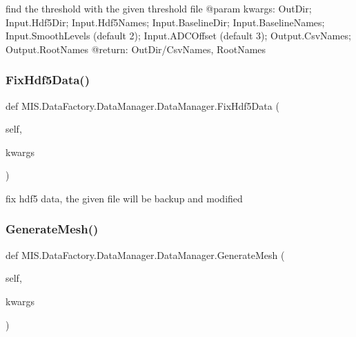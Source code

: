 \begin{DoxyVerb}find the threshold with the given threshold file
@param kwargs: OutDir; Input.Hdf5Dir; Input.Hdf5Names; Input.BaselineDir; Input.BaselineNames;
    Input.SmoothLevels (default 2); Input.ADCOffset (default 3); Output.CsvNames; Output.RootNames
@return: OutDir/CsvNames, RootNames
\end{DoxyVerb}
 \mbox{\label{classMIS_1_1DataFactory_1_1DataManager_1_1DataManager_a527698e508175494049d1170eb263fea}} 
\subsubsection{\texorpdfstring{Fix\+Hdf5\+Data()}{FixHdf5Data()}}
{\footnotesize\ttfamily def M\+I\+S.\+Data\+Factory.\+Data\+Manager.\+Data\+Manager.\+Fix\+Hdf5\+Data (\begin{DoxyParamCaption}\item[{}]{self,  }\item[{}]{kwargs }\end{DoxyParamCaption})}

\begin{DoxyVerb}fix hdf5 data, the given file will be backup and modified\end{DoxyVerb}
 \mbox{\label{classMIS_1_1DataFactory_1_1DataManager_1_1DataManager_a94176bcc4c3de7974b29e1e1a2396de8}} 
\subsubsection{\texorpdfstring{Generate\+Mesh()}{GenerateMesh()}}
{\footnotesize\ttfamily def M\+I\+S.\+Data\+Factory.\+Data\+Manager.\+Data\+Manager.\+Generate\+Mesh (\begin{DoxyParamCaption}\item[{}]{self,  }\item[{}]{kwargs }\end{DoxyParamCaption})}

